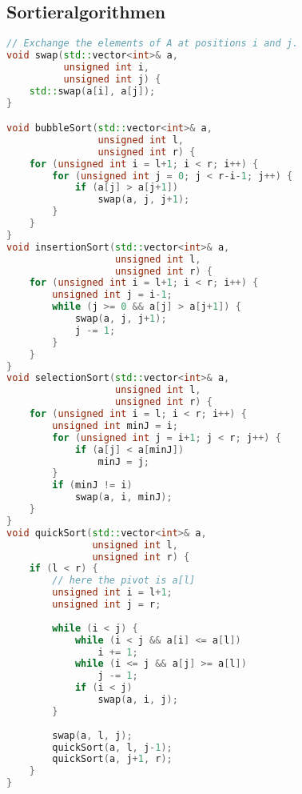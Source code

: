 \subsection{Sortieralgorithmen}
\begin{lstlisting}[language=C++]
// Exchange the elements of A at positions i and j.
void swap(std::vector<int>& a, 
          unsigned int i, 
          unsigned int j) {
    std::swap(a[i], a[j]);
}

void bubbleSort(std::vector<int>& a, 
                unsigned int l, 
                unsigned int r) {
    for (unsigned int i = l+1; i < r; i++) {
        for (unsigned int j = 0; j < r-i-1; j++) {
            if (a[j] > a[j+1])
                swap(a, j, j+1);
        }
    }
}
void insertionSort(std::vector<int>& a, 
                   unsigned int l, 
                   unsigned int r) {
    for (unsigned int i = l+1; i < r; i++) {
        unsigned int j = i-1;
        while (j >= 0 && a[j] > a[j+1]) {
            swap(a, j, j+1);
            j -= 1;
        }
    }
}
void selectionSort(std::vector<int>& a, 
                   unsigned int l, 
                   unsigned int r) {
    for (unsigned int i = l; i < r; i++) {
        unsigned int minJ = i;
        for (unsigned int j = i+1; j < r; j++) {
            if (a[j] < a[minJ])
                minJ = j;
        }
        if (minJ != i)
            swap(a, i, minJ);
    }
}
void quickSort(std::vector<int>& a, 
               unsigned int l, 
               unsigned int r) {
    if (l < r) {
        // here the pivot is a[l]
        unsigned int i = l+1;
        unsigned int j = r;
        
        while (i < j) {
            while (i < j && a[i] <= a[l])
                i += 1;
            while (i <= j && a[j] >= a[l])
                j -= 1;
            if (i < j)
                swap(a, i, j);
        }
        
        swap(a, l, j);
        quickSort(a, l, j-1);
        quickSort(a, j+1, r);
    }
}
\end{lstlisting}

